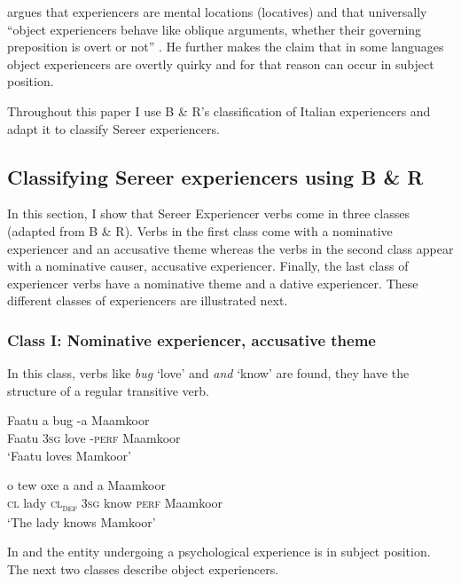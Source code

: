 \documentclass[output=paper]{langscibook}
\begin{document}
\citeauthor{Landau2010} argues that experiencers are mental locations (locatives) and that universally “object experiencers behave like oblique arguments, whether their governing preposition is overt or not” \citet[127]{Landau2010}. He further makes the claim that in some languages object experiencers are overtly quirky and for that reason can occur in subject position.


Throughout this paper I use B \& R’s classification of Italian experiencers and adapt it to classify Sereer experiencers.

\subsection{Classifying Sereer experiencers using B \& R}

In this section, I show that Sereer Experiencer verbs come in three classes (adapted from B \& R). Verbs in the first class come with a nominative experiencer and an accusative theme whereas the verbs in the second class appear with a nominative causer, accusative experiencer. Finally, the last class of experiencer verbs have a nominative theme and a dative experiencer. These different classes of experiencers are illustrated next. 



\subsubsection{Class I: Nominative experiencer, accusative theme}

In this class, verbs like \textit{bug} ‘love’ and  \textit{and} ‘know’ are found, they have the structure of a regular transitive verb.

\ea \label{ex:tamba:4}
\ea \label{ex:tamba:4a}
\gll Faatu  a      bug    {}-a         Maamkoor\\      
Faatu    \textsc{3sg}  love    {}-\textsc{perf}   Maamkoor\\
\glt `Faatu loves Mamkoor'

\ex \label{ex:tamba:4b}
\gll o  tew  oxe    a     and      a      Maamkoor \\
\textsc{cl}  lady  \textsc{cl\textsubscript{def}}   \textsc{3sg}  know  \textsc{perf}   Maamkoor\\
\glt `The lady knows Mamkoor'
\z
\z
    

In  and  the entity undergoing a psychological experience is in subject position. The next two classes describe object experiencers.
\end{document}
